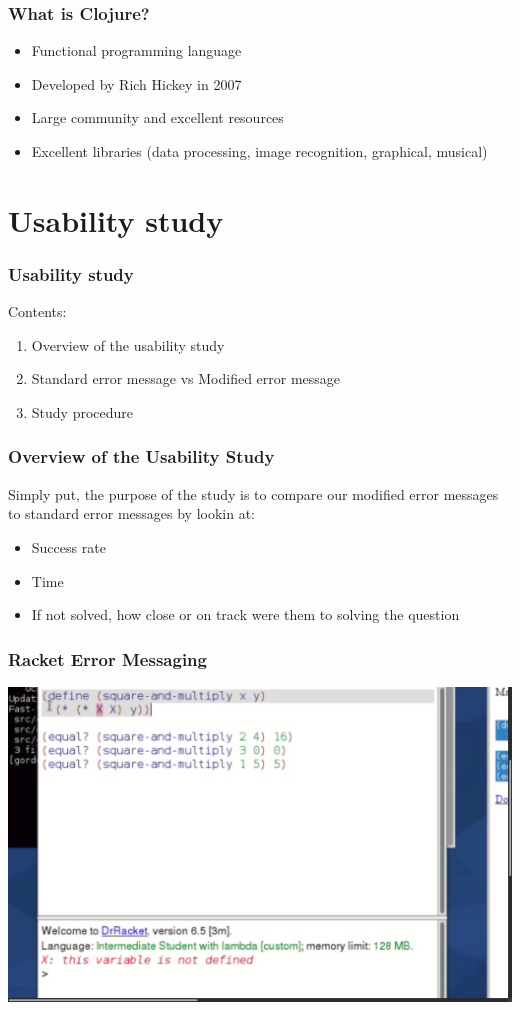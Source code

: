 \documentclass{beamer}
\begin{document}
\begin{frame}
	\frametitle{What is Clojure?}
	\begin{itemize}
		\item Functional programming language
		\item Developed by Rich Hickey in 2007
		\item Large community and excellent resources
		\item Excellent libraries (data processing, image recognition, graphical, musical)
	\end{itemize}
\end{frame}



\section{Usability study}

\begin{frame}
  \frametitle{Usability study}
Contents:
\begin{enumerate}
\item Overview of the usability study 
\item Standard error message vs Modified error message
\item Study procedure
\end{enumerate}
\end{frame}


\begin{frame}
  \frametitle{Overview of the Usability Study}
Simply put, the purpose of the study is to compare our modified error messages to standard error messages by lookin at:
\begin{itemize}
\item Success rate
\item Time
\item If not solved, how close or on track were them to solving the question
\end{itemize} 
\end{frame}

\begin{frame}
  \frametitle{Racket Error Messaging}
  \includegraphics[scale=.17]{R2Rshot}
\end{frame}
\end{document}
